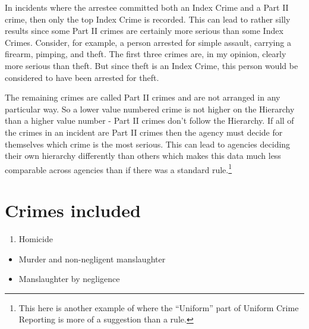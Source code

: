 \documentclass[
  12pt,
  openany]{book}
\providecommand{\tightlist}{%
  \setlength{\itemsep}{0pt}\setlength{\parskip}{0pt}}
\begin{document}
In incidents where the arrestee committed both an Index Crime and a Part II crime, then only the top Index Crime is recorded. This can lead to rather silly results since some Part II crimes are certainly more serious than some Index Crimes. Consider, for example, a person arrested for simple assault, carrying a firearm, pimping, and theft. The first three crimes are, in my opinion, clearly more serious than theft. But since theft is an Index Crime, this person would be considered to have been arrested for theft.

The remaining crimes are called Part II crimes and are not arranged in any particular way. So a lower value numbered crime is not higher on the Hierarchy than a higher value number - Part II crimes don't follow the Hierarchy. If all of the crimes in an incident are Part II crimes then the agency must decide for themselves which crime is the most serious. This can lead to agencies deciding their own hierarchy differently than others which makes this data much less comparable across agencies than if there was a standard rule.\footnote{This here is another example of where the ``Uniform'' part of Uniform Crime Reporting is more of a suggestion than a rule.}

\section{Crimes included}\label{arrestsCrimesIncluded}

\begin{enumerate}
\def\labelenumi{\arabic{enumi}.}
\tightlist
\item
  Homicide
\end{enumerate}

\begin{itemize}
\tightlist
\item
  Murder and non-negligent manslaughter
\item
  Manslaughter by negligence
\end{itemize}
\end{document}

